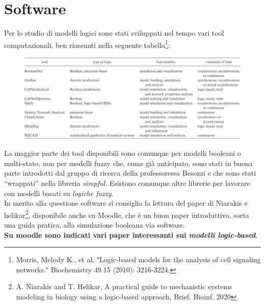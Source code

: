 \documentclass[a4paper,12pt, oneside]{book}
\begin{document}
\section{Software}
Per lo studio di modelli logici sono stati sviluppati nel tempo vari tool
computazionali, ben riassunti nella seguente tabella\footnote{Morris, Melody K.,
  et al. "Logic-based models for the analysis of cell signaling networks."
  Biochemistry 49.15 (2010): 3216-3224.}:
\begin{figure}[H]
  \centering
  \includegraphics[width = \textwidth]{img/logtool.jpg}
\end{figure}
La maggior parte dei tool disponibili sono comunque per modelli booleani o
multi-stato, non per modelli fuzzy che, come già anticipato, sono stati in buona
parte introdotti dal gruppo di ricerca della professoressa Besozzi e che sono
stati ``wrappati'' nella libreria \textit{simpful}. Esistono comunque altre
librerie per lavorare con modelli basati su \textit{logiche fuzzy}.\\
In merito alla questione software si consiglia la lettura del paper di Niarakis
e helikar\footnote{A. Niarakis and T. Helikar, A practical guide to mechanistic
  systems modeling in biology using a logic-based approach,
  Brief. Bioinf. 2020}, disponibile anche su Moodle, che è un buon paper
introduttivo, sorta una guida pratica, alla simulazione booleana via software.\\
\textbf{Su moodle sono indicati vari paper interessanti sui \textit{modelli
    logic-based}}. 
\end{document}
